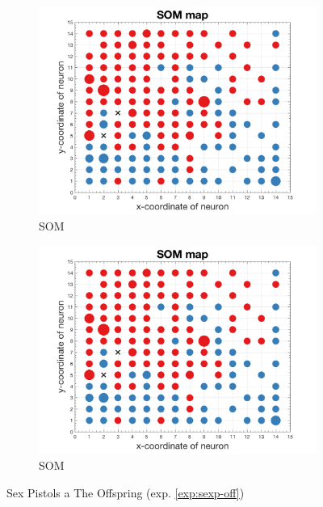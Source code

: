 \documentclass[thesis=M,czech]{FITthesis}[2012/06/26]
\begin{document}
\begin{figure}
\begin{subfigure}{.5\textwidth}
  \centering
  \includegraphics[width=1\linewidth]{exp_sexp_off_som.png}
  \caption{SOM}
  \label{fig:sub1}
\end{subfigure}%
\begin{subfigure}{.5\textwidth}
  \centering
  \includegraphics[width=1\linewidth]{exp_sexp_off_som.png}
  \caption{SOM}
  \label{fig:sub1}
\end{subfigure}%


\caption{Sex Pistols a The Offspring (exp. \ref{exp:sexp-off})}
\label{fig:top}


\end{figure}
\end{document}
